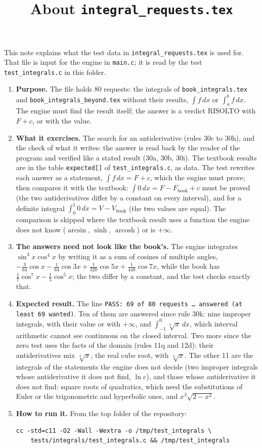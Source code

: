 \documentclass[11pt,a4paper]{article}
\title{About \texttt{integral\_requests.tex}}
\author{}
\date{}
\begin{document}
\maketitle
This note explains what the test data in \texttt{integral\_requests.tex} is used for. That file is input for the engine in \texttt{main.c}; it is read by the test \texttt{test\_integrals.c} in this folder.

\begin{enumerate}
\item \textbf{Purpose.} The file holds 80 requests: the integrals of \texttt{book\_integrals.tex} and \texttt{book\_integrals\_beyond.tex} without their results, $\int f \, dx$ or $\int_{a}^{b} f \, dx$. The engine must find the result itself; the answer is a verdict RISOLTO with $F + c$, or with the value.

\item \textbf{What it exercises.} The search for an antiderivative (rules 30c to 30h), and the check of what it writes: the answer is read back by the reader of the program and verified like a stated result (30a, 30b, 30i). The textbook results are in the table \texttt{expected[]} of \texttt{test\_integrals.c}, as data. The test rewrites each answer as a statement, $\int f \, dx = F + c$, which the engine must prove; then compares it with the textbook: $\int 0 \, dx = F - F_{\mathrm{book}} + c$ must be proved (the two antiderivatives differ by a constant on every interval), and for a definite integral $\int_{0}^{1} 0 \, dx = V - V_{\mathrm{book}}$ (the two values are equal). The comparison is skipped where the textbook result uses a function the engine does not know ($\arcsin$, $\sinh$, $\operatorname{arcosh}$) or is $+\infty$.

\item \textbf{The answers need not look like the book's.} The engine integrates $\sin^{3} x \cos^{4} x$ by writing it as a sum of cosines of multiple angles, $-\frac{3}{64}\cos x - \frac{1}{64}\cos 3x + \frac{1}{320}\cos 5x + \frac{1}{448}\cos 7x$, while the book has $\frac{1}{7}\cos^{7} x - \frac{1}{5}\cos^{5} x$; the two differ by a constant, and the test checks exactly that.

\item \textbf{Expected result.} The line \texttt{PASS: 69 of 80 requests \ldots{} answered (at least 69 wanted)}. Ten of them are answered since rule 30k: nine improper integrals, with their value or with $+\infty$, and $\int_{-1}^{0} \sqrt[5]{x} \, dx$, which interval arithmetic cannot see continuous on the closed interval. Two more since the zero test uses the facts of the domain (rules 11q and 12d): their antiderivatives mix $\sqrt[3]{x}$, the real cube root, with $\sqrt[6]{x}$. The other 11 are the integrals of the statements the engine does not decide (two improper integrals whose antiderivative it does not find, $\ln e$), and those whose antiderivative it does not find: square roots of quadratics, which need the substitutions of Euler or the trigonometric and hyperbolic ones, and $x^{3}\sqrt{2 - x^{2}}$.

\item \textbf{How to run it.} From the top folder of the repository:
\begin{verbatim}
cc -std=c11 -O2 -Wall -Wextra -o /tmp/test_integrals \
    tests/integrals/test_integrals.c && /tmp/test_integrals
\end{verbatim}
\end{enumerate}
\end{document}
